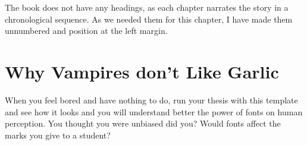 The book does not have any headings, as each chapter narrates the story in a chronological sequence. As we needed them for this chapter, I have made them unnumbered and position at the left margin.



\chapter{Why Vampires don’t Like Garlic}

When you feel bored and have nothing to do, run your thesis with this template and see how it looks and you will understand better the power of fonts on human perception. You thought you were unbiased did you? Would fonts affect the marks you give to a student?

















\makeatother

